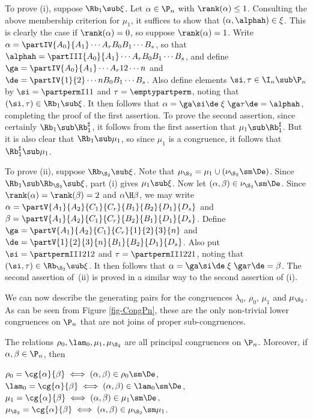 \pf To prove (i), suppose $\Rb_1\sub\xi$.  Let $\alpha\in\P_n$ with $\rank(\alpha)\leq1$.  
Consulting the above membership criterion for $\mu_1$, it suffices to show that
$(\alpha,\alphah)\in\xi$.  This is clearly the case if $\rank(\alpha)=0$, so suppose $\rank(\alpha)=1$.  Write $\alpha=\partIV{A_0}{A_1}\cdots{A_r}{B_0}{B_1}\cdots{B_s}$, so that $\alphah=\partIII{A_0}{A_1}\cdots{A_r}{B_0}{B_1}\cdots{B_s}$, and define $\ga=\partIV{A_0}{A_1}\cdots{A_r}{1}{2}\cdots{n}$ and $\de=\partIV{1}{2}\cdots{n}{B_0}{B_1}\cdots{B_s}$.
Also define elements $\si,\tau\in\I_n\sub\P_n$ by $\si=\partpermI11$ and $\tau=\emptypartperm$, noting that $(\si,\tau)\in\Rb_1\sub\xi$.  It then follows that $\alpha=\ga\si\de \mathrel\xi \ga\tau\de = \alphah$, completing the proof of the first assertion.  To prove the second assertion, since certainly $\Rb_1\sub\Rb_1^\sharp$, it follows from the first assertion that $\mu_1\sub\Rb_1^\sharp$.  But it is also clear that $\Rb_1\sub\mu_1$, so since $\mu_1$ is a congruence, it follows that $\Rb_1^\sharp\sub\mu_1$.


To prove (ii), suppose $\Rb_{\S_2}\sub\xi$. Note that $\mu_{\S_2}=\mu_1\cup(\nu_{\S_2}\sm\De)$.
 Since $\Rb_1\sub\Rb_{\S_2}\sub\xi$, part (i) gives $\mu_1\sub\xi$.  
Now let $(\alpha,\beta)\in\nu_{\S_2}\sm\De$.  Since $\rank(\alpha)=\rank(\beta)=2$ and $\alpha\H\beta$, we may write $\alpha=\partV{A_1}{A_2}{C_1}{C_r}{B_1}{B_2}{D_1}{D_s}$ and $\beta=\partV{A_1}{A_2}{C_1}{C_r}{B_2}{B_1}{D_1}{D_s}$.  Define $\ga=\partV{A_1}{A_2}{C_1}{C_r}{1}{2}{3}{n}$ and $\de=\partV{1}{2}{3}{n}{B_1}{B_2}{D_1}{D_s}$.
Also put $\si=\partpermII1212$ and $\tau=\partpermII1221$, noting that $(\si,\tau)\in\Rb_{\S_2}\sub\xi$.  It then follows that $\alpha=\ga\si\de \mathrel\xi \ga\tau\de = \beta$.  The second assertion of~(ii) is proved in a similar way to the second assertion of (i).  \epf

We can now describe the generating pairs for the congruences $\lambda_0$, $\rho_0$, $\mu_1$ and $\mu_{\S_2}$.  As can be seen from Figure \ref{fig-CongPn}, these are the only non-trivial lower congruences on $\P_n$ that are not joins of proper sub-congruences.



\begin{prop}\label{prop:small_congruences}
The relations $\rho_0,\lam_0,\mu_1,\mu_{\S_2}$ are all principal congruences on $\P_n$.  Moreover, if $\alpha,\beta\in\P_n$, then
\begin{itemize}\begin{multicols}{2}
 $\rho_0=\cg{\alpha}{\beta}\iff (\alpha,\beta)\in\rho_0\sm\De$,
 $\lam_0=\cg{\alpha}{\beta}\iff (\alpha,\beta)\in\lam_0\sm\De$,
 $\mu_1=\cg{\alpha}{\beta}\iff (\alpha,\beta)\in\mu_1\sm\De$, 
 $\mu_{\S_2}=\cg{\alpha}{\beta}\iff (\alpha,\beta)\in\mu_{\S_2}\sm\mu_1$.
\end{multicols}\end{itemize}
\end{prop}

